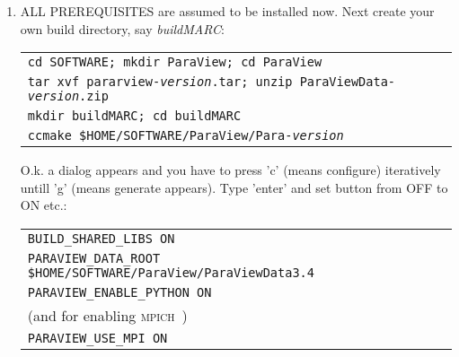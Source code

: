 \documentclass[a4paper,12pt]{article}
\newcommand{\mpich}{\textsc{mpich}\ }
\begin{document}
\begin{enumerate}
\item ALL PREREQUISITES are assumed to be installed now. Next create your own build directory, say \textit{buildMARC}: 
  \begin{center}
    \begin{tabular}{l}
      \texttt{cd SOFTWARE; mkdir ParaView; cd ParaView}\\
      \texttt{tar xvf pararview-\textit{version}.tar; unzip ParaViewData-\textit{version}.zip}\\
      \texttt{mkdir buildMARC; cd buildMARC}\\
      \texttt{ccmake \$HOME/SOFTWARE/ParaView/Para-\textit{version}}
      \end{tabular}
      \end{center} 
O.k. a dialog appears and you have to press 'c' (means configure)
   iteratively untill 'g' (means generate appears). Type 'enter' and set button
   from OFF to ON etc.:
   \begin{center}
    \begin{tabular}{l}
        \texttt{BUILD\_SHARED\_LIBS                ON}\\
       \texttt{PARAVIEW\_DATA\_ROOT    \$HOME/SOFTWARE/ParaView/ParaViewData3.4
}\\
 \texttt{PARAVIEW\_ENABLE\_PYTHON           ON}\\
   (and for enabling \mpich)\\
 \texttt{PARAVIEW\_USE\_MPI                 ON}

     \end{tabular}
    \end{center}


\end{enumerate}
\end{document}
